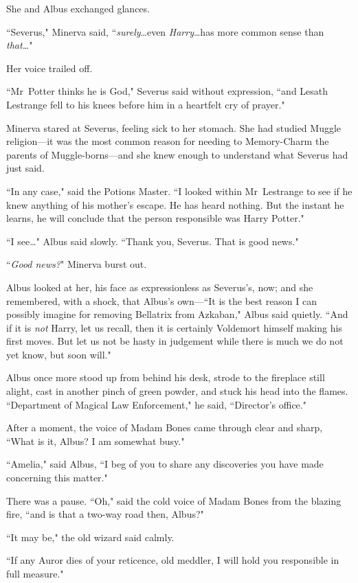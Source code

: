She and Albus exchanged glances.

``Severus," Minerva said, ``\emph{surely}…even \emph{Harry}…has more common sense than \emph{that…}"

Her voice trailed off.

``Mr~Potter thinks he is God," Severus said without expression, ``and Lesath Lestrange fell to his knees before him in a heartfelt cry of prayer."

Minerva stared at Severus, feeling sick to her stomach. She had studied Muggle religion—it was the most common reason for needing to Memory-Charm the parents of Muggle-borns—and she knew enough to understand what Severus had just said.

``In any case," said the Potions Master. ``I looked within Mr~Lestrange to see if he knew anything of his mother's escape. He has heard nothing. But the instant he learns, he will conclude that the person responsible was Harry Potter."

``I see…" Albus said slowly. ``Thank you, Severus. That is good news."

``\emph{Good news?}" Minerva burst out.

Albus looked at her, his face as expressionless as Severus's, now; and she remembered, with a shock, that Albus's own—``It is the best reason I can possibly imagine for removing Bellatrix from Azkaban," Albus said quietly. ``And if it is \emph{not} Harry, let us recall, then it is certainly Voldemort himself making his first moves. But let us not be hasty in judgement while there is much we do not yet know, but soon will."

Albus once more stood up from behind his desk, strode to the fireplace still alight, cast in another pinch of green powder, and stuck his head into the flames. ``Department of Magical Law Enforcement," he said, ``Director's office."

After a moment, the voice of Madam Bones came through clear and sharp, ``What is it, Albus? I am somewhat busy."

``Amelia," said Albus, ``I beg of you to share any discoveries you have made concerning this matter."

There was a pause. ``Oh," said the cold voice of Madam Bones from the blazing fire, ``and is that a two-way road then, Albus?"

``It may be," the old wizard said calmly.

``If any Auror dies of your reticence, old meddler, I will hold you responsible in full measure."

